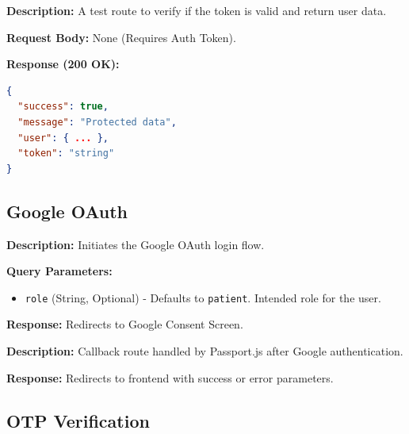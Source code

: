 \documentclass{article}
\begin{document}
\begin{tcolorbox}[title=\textcolor{accent}{GET} /api/protected]
\textbf{Description:} A test route to verify if the token is valid and return user data.

\vspace{0.5em}
\textbf{Request Body:} None (Requires Auth Token).

\vspace{0.5em}
\textbf{Response (200 OK):}
\begin{lstlisting}[language=json]
{
  "success": true,
  "message": "Protected data",
  "user": { ... },
  "token": "string"
}
\end{lstlisting}
\end{tcolorbox}

\subsection{Google OAuth}

\begin{tcolorbox}[title=\textcolor{accent}{GET} /api/auth/google]
\textbf{Description:} Initiates the Google OAuth login flow.

\vspace{0.5em}
\textbf{Query Parameters:}
\begin{itemize}
    \item \texttt{role} (String, Optional) - Defaults to \texttt{patient}. Intended role for the user.
\end{itemize}

\vspace{0.5em}
\textbf{Response:} Redirects to Google Consent Screen.
\end{tcolorbox}

\begin{tcolorbox}[title=\textcolor{accent}{GET} /api/auth/google/callback]
\textbf{Description:} Callback route handled by Passport.js after Google authentication.

\vspace{0.5em}
\textbf{Response:} Redirects to frontend with success or error parameters.
\end{tcolorbox}

\subsection{OTP Verification}
\end{document}

